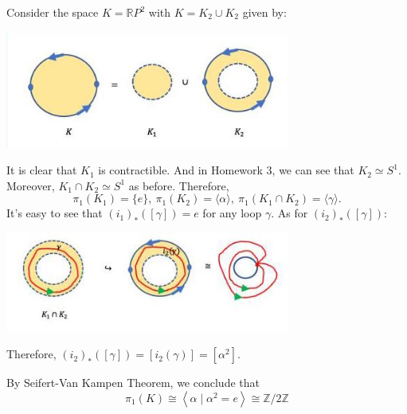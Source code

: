 \begin{example}
Consider the space \(K = \mathbb{R}{P}^{2}\) with \(K = {K}_{2} \cup  {K}_{2}\) given by:
\begin{center}
\includegraphics[width=0.7\textwidth]{images/Ch9_RP2_K1K2.jpg}
\end{center}
It is clear that \({K}_{1}\) is contractible. And in Homework 3, we can see that \({K}_{2} \simeq  {S}^{1}\). Moreover, \({K}_{1} \cap  {K}_{2} \simeq  {S}^{1}\) as before. Therefore, 
\[{\pi }_{1}\left( {K}_{1}\right)  = \{ e\},\ {\pi }_{1}\left( {K}_{2}\right)  = \langle \alpha \rangle,\ {\pi }_{1}\left( {{K}_{1} \cap  {K}_{2}}\right)  = \langle \gamma \rangle.\]
It’s easy to see that \({\left( {i}_{1}\right) }_{ * }\left( \left\lbrack  \gamma \right\rbrack  \right)  = e\) for any loop \(\gamma\). As for \({\left( {i}_{2}\right) }_{ * }\left( \left\lbrack  \gamma \right\rbrack  \right)\):
\begin{center}
\includegraphics[width=0.7\textwidth]{images/Ch9_RP2_i2star.jpg}
\end{center}
Therefore, \({\left( {i}_{2}\right) }_{ * }\left( \left\lbrack  \gamma \right\rbrack  \right)  = \left\lbrack  {{i}_{2}\left( \gamma \right) }\right\rbrack   = \left\lbrack  {\alpha }^{2}\right\rbrack\).

By Seifert-Van Kampen Theorem, we conclude that
\[
{\pi }_{1}\left( K\right)  \cong  \left\langle  {\alpha  \mid  {\alpha }^{2} = e}\right\rangle   \cong  \mathbb{Z}/2\mathbb{Z}
\]
\end{example}

